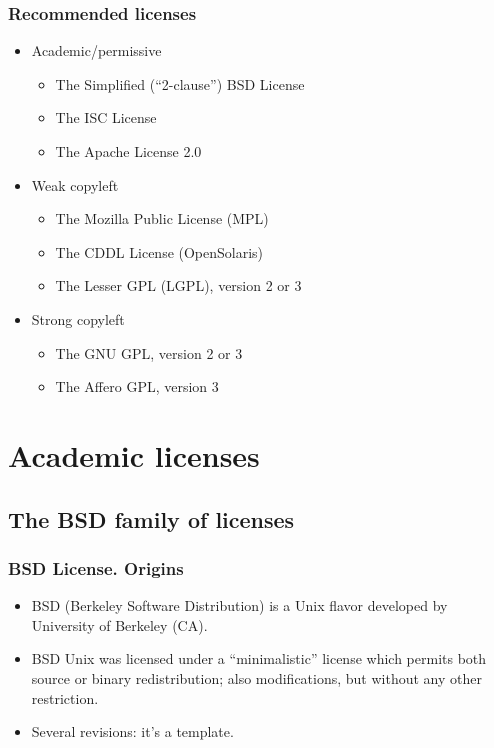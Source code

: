 \documentclass{beamer}
\begin{document}

\begin{frame}
\frametitle{Recommended licenses}

\begin{itemize}
\item	\alert{Academic/permissive}
	\begin{itemize}
	\item The Simplified (``2-clause'') BSD License 
	\item The ISC License
	\item The Apache License 2.0 
	\end{itemize}
\item \alert{Weak copyleft}
	\begin{itemize}
	\item The Mozilla Public License (MPL) 
	\item The CDDL License (OpenSolaris) 
	\item The Lesser GPL (LGPL), version 2 or 3
	\end{itemize}
\item \alert{Strong copyleft}
	\begin{itemize}
	\item The GNU GPL, version 2 or 3 
	\item The Affero GPL, version 3
	\end{itemize}
\end{itemize}

\end{frame}


\section{Academic licenses}
\subsection{The BSD family of licenses}

\begin{frame}
\frametitle{BSD License. Origins}

\begin{itemize}
\item BSD (Berkeley Software Distribution) is a Unix flavor developed
  by University of Berkeley (CA).
\item BSD Unix was licensed under a ``minimalistic'' license which
  permits both source or binary redistribution; also modifications,
  but without any other restriction.
\item Several revisions: it's a \alert{template}.
\end{itemize}

\end{frame}
\end{document}
